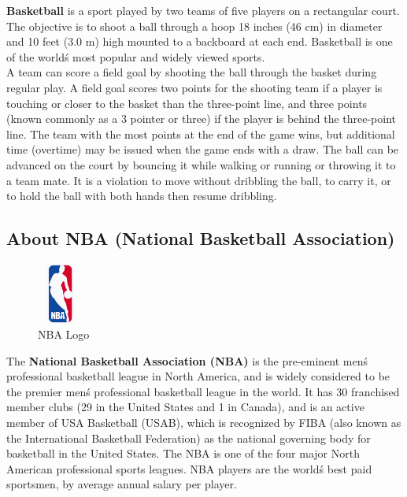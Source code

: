 \documentclass[a4paper]{article}
\begin{document}
\textbf{Basketball} is a sport played by two teams of five players on a rectangular court. The objective is to shoot a ball through a hoop 18 inches (46 cm) in diameter and 10 feet (3.0 m) high mounted to a backboard at each end. Basketball is one of the world\'s most popular and widely viewed sports.\\ %
A team can score a field goal by shooting the ball through the basket during regular play. A field goal scores two points for the shooting team if a player is touching or closer to the basket than the three-point line, and three points (known commonly as a 3 pointer or three) if the player is behind the three-point line. The team with the most points at the end of the game wins, but additional time (overtime) may be issued when the game ends with a draw. The ball can be advanced on the court by bouncing it while walking or running or throwing it to a team mate. It is a violation to move without dribbling the ball, to carry it, or to hold the ball with both hands then resume dribbling. 

\vspace{1cm}

\subsection{About NBA (National Basketball Association)}
\vspace{1cm}

\begin{figure}[ht]
\begin{center}
\includegraphics[width=1.5cm,height=2cm]{NBALogo.png}
\end{center}
\caption{NBA Logo}
\label{Img:NBALogo}
\end{figure}
\vspace{1cm}
The \textbf{National Basketball Association (NBA)} is the pre-eminent men\'s professional basketball league in North America, and is widely considered to be the premier men\'s professional basketball league in the world. It has 30 franchised member clubs (29 in the United States and 1 in Canada), and is an active member of USA Basketball (USAB), which is recognized by FIBA (also known as the International Basketball Federation) as the national governing body for basketball in the United States. The NBA is one of the four major North American professional sports leagues. NBA players are the world\'s best paid sportsmen, by average annual salary per player.
\vspace{1cm}
\end{document}
